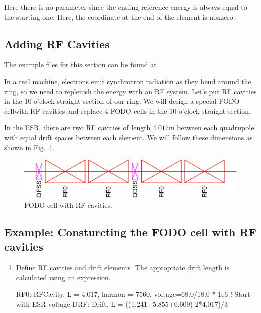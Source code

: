 \documentclass{hitec}     %
\begin{document}
{Here there is no  parameter since the ending reference energy is always equal to the
starting one. Here, the  coordinate at the end of the element is nonzero.

\subsection{Adding RF Cavities}

The example files for this section can be found at 

In a real machine, electrons emit synchrotron radiation as they bend around the ring, so we need to replenish the energy with an RF system. Let’s put RF cavities in the 10 o’clock straight section of our ring. We will design a special FODO cellwith RF cavities  and replace 4 FODO cells in the 10 o’clock straight section. 

In the ESR, there are two RF cavities of length $4.017 \textrm{m}$ between each quadrupole with equal drift spaces between each element. We will follow these dimensions as shown in Fig.~\ref{f:fodorf}.

\begin{figure}[!h]
  \centering
  \includegraphics[width=0.9\linewidth]{figures/rf.pdf}
  \caption{FODO cell with RF cavities.}
  \label{f:fodorf}
\end{figure}

\subsection{Example: Consturcting the FODO cell with RF cavities}

\begin{enumerate}[leftmargin=*]
    \item Define RF cavities and drift elements. The appropriate drift length is calculated using an expression.
    \begin{code}
RF0: RFCavity, L = 4.017, harmon = 7560,
        voltage=68.0/18.0 * 1e6 ! Start with ESR voltage
DRF: Drift, L = ((1.241+5.855+0.609)-2*4.017)/3
    \end{code}
    

\end{enumerate}}
\end{document}
